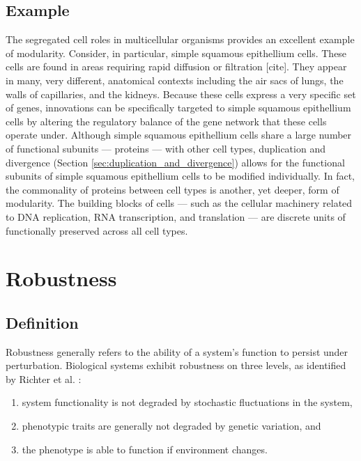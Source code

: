 \subsection{Example}
The segregated cell roles in multicellular organisms provides an excellent example of modularity. Consider, in particular, simple squamous epithellium cells. These cells are found in areas requiring rapid diffusion or filtration [cite]. They appear in many, very different, anatomical contexts including the air sacs of lungs, the walls of capillaries, and the kidneys. Because these cells express a very specific set of genes, innovations can be specifically targeted to simple squamous epithellium cells by altering the regulatory balance of the gene network that these cells operate under. Although simple squamous epithellium cells share a large number of functional subunits --- proteins --- with other cell types, duplication and divergence (Section \ref{sec:duplication_and_divergence}) allows for the functional subunits of simple squamous epithellium cells to be modified individually. In fact, the commonality of proteins between cell types is another, yet deeper, form of modularity. The building blocks of cells --- such as the cellular machinery related to DNA replication, RNA transcription, and translation --- are discrete units of functionally preserved across all cell types.

\section{Robustness} \label{sec:robustness}
\subsection{Definition}
Robustness generally refers to the ability of a system's function to persist under perturbation. Biological systems exhibit robustness on three levels, as identified by Richter et al. \cite{Richter2015EvolvabilitySurvey}:
\begin{enumerate}
    \item system functionality is not degraded by stochastic fluctuations in the system, \label{item:robustness_stochastic}
  	\item phenotypic traits are generally not degraded by genetic variation, and \label{item:robustness_genetic}
    \item the phenotype is able to function if environment changes. \label{item:robustness_environment}
\end{enumerate}
  
